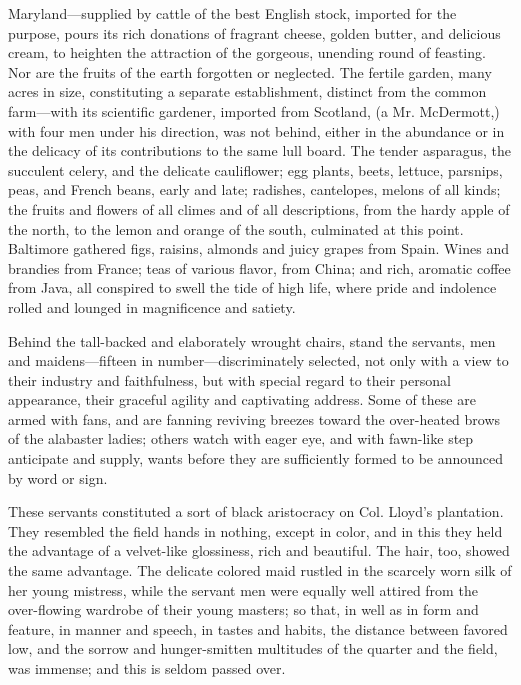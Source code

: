 Maryland---supplied by cattle of the best English stock, imported for
the purpose, pours its rich donations of fragrant cheese, golden butter,
and delicious cream, to heighten the attraction of the gorgeous,
unending round of feasting. Nor are the fruits of the earth forgotten or
neglected. The fertile garden, many acres in size, constituting a
separate establishment, distinct from the common farm---with its
scientific gardener, imported from Scotland, (a Mr. McDermott,) with
four men under his direction, was not behind, either in the abundance or
in the delicacy of its contributions to the same lull board. The tender
asparagus, the succulent celery, and the delicate cauliflower; egg
plants, beets, lettuce, parsnips, peas, and French beans, early and
late; radishes, cantelopes, melons of all kinds; the fruits and flowers
of all {\protect\hypertarget{109}{}{}}climes and of all descriptions,
from the hardy apple of the north, to the lemon and orange of the south,
culminated at this point. Baltimore gathered figs, raisins, almonds and
juicy grapes from Spain. Wines and brandies from France; teas of various
flavor, from China; and rich, aromatic coffee from Java, all conspired
to swell the tide of high life, where pride and indolence rolled and
lounged in magnificence and satiety.

Behind the tall-backed and elaborately wrought chairs, stand the
servants, men and maidens---fifteen in number---discriminately selected,
not only with a view to their industry and faithfulness, but with
special regard to their personal appearance, their graceful agility and
captivating address. Some of these are armed with fans, and are fanning
reviving breezes toward the over-heated brows of the alabaster ladies;
others watch with eager eye, and with fawn-like step anticipate and
supply, wants before they are sufficiently formed to be announced by
word or sign.

These servants constituted a sort of black aristocracy on Col. Lloyd's
plantation. They resembled the field hands in nothing, except in color,
and in this they held the advantage of a velvet-like glossiness, rich
and beautiful. The hair, too, showed the same advantage. The delicate
colored maid rustled in the scarcely worn silk of her young mistress,
while the servant men were equally well attired from the over-flowing
wardrobe of their young masters; so that, in well as in form and
feature, in manner and speech, in tastes and habits, the distance
between favored low, and the sorrow and hunger-smitten
{\protect\hypertarget{110}{}{}}multitudes of the quarter and the field,
was immense; and this is seldom passed over.

